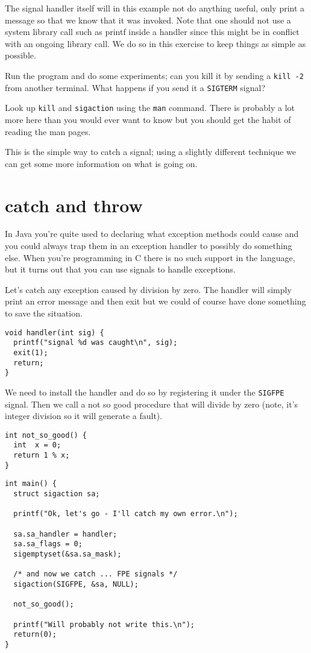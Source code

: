 \documentclass[a4paper,11pt]{article}
\begin{document}
The signal handler itself will in this example not do anything
useful, only print a message so that we know that it was invoked. Note
that one should not use a system library call such as printf inside a
handler since this might be in conflict with an ongoing library
call. We do so in this exercise to keep things as simple as possible.


Run the program and do some experiments; can you kill it by sending a
{\tt kill -2} from another terminal. What happens if you send
it a {\tt SIGTERM} signal?

Look up {\tt kill} and {\tt sigaction} using the {\tt man}
command. There is probably a lot more here than you would ever want to
know but you should get the habit of reading the man pages. 

This is the simple way to catch a signal; using a slightly different
technique we can get some more information on what is going on.


\section{catch and throw}

In Java you're quite used to declaring what exception methods could
cause and you could always trap them in an exception handler to
possibly do something else. When you're programming in C there is no
such support in the language, but it turns out that you can use signals
to handle exceptions. 

Let's catch any exception caused by division by zero. The handler will
simply print an error message and then exit but we could of course have
done something to save the situation.

\begin{lstlisting}
void handler(int sig) {
  printf("signal %d was caught\n", sig);
  exit(1); 
  return;
}
\end{lstlisting}

We need to install the handler and do so by registering it under the
{\tt SIGFPE} signal. Then we call a not so good procedure that will
divide by zero (note, it's integer division so it will generate a fault).

\begin{lstlisting}
int not_so_good() {
  int  x = 0;
  return 1 % x;
}
\end{lstlisting}

\begin{lstlisting}
int main() {
  struct sigaction sa;

  printf("Ok, let's go - I'll catch my own error.\n");  

  sa.sa_handler = handler;
  sa.sa_flags = 0;
  sigemptyset(&sa.sa_mask);

  /* and now we catch ... FPE signals */
  sigaction(SIGFPE, &sa, NULL);
  
  not_so_good();

  printf("Will probably not write this.\n");    
  return(0);
}
\end{lstlisting}
\end{document}

